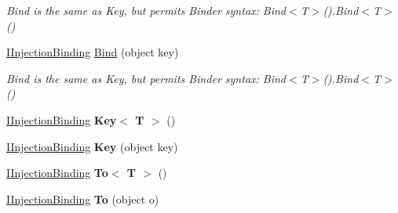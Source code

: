 \begin{DoxyCompactItemize}
\begin{DoxyCompactList}\small\item\em Bind is the same as Key, but permits Binder syntax\-: {\ttfamily Bind$<$T$>$().Bind$<$T$>$()} \end{DoxyCompactList}\item 
\hypertarget{interfacestrange_1_1extensions_1_1injector_1_1api_1_1_i_injection_binding_a156db878da329196cb7db46768db3326}{\hyperlink{interfacestrange_1_1extensions_1_1injector_1_1api_1_1_i_injection_binding}{I\-Injection\-Binding} \hyperlink{interfacestrange_1_1extensions_1_1injector_1_1api_1_1_i_injection_binding_a156db878da329196cb7db46768db3326}{Bind} (object key)}\label{interfacestrange_1_1extensions_1_1injector_1_1api_1_1_i_injection_binding_a156db878da329196cb7db46768db3326}

\begin{DoxyCompactList}\small\item\em Bind is the same as Key, but permits Binder syntax\-: {\ttfamily Bind$<$T$>$().Bind$<$T$>$()} \end{DoxyCompactList}\item 
\hypertarget{interfacestrange_1_1extensions_1_1injector_1_1api_1_1_i_injection_binding_a2ba440297e1fb241be2a5977aef2acf0}{\hyperlink{interfacestrange_1_1extensions_1_1injector_1_1api_1_1_i_injection_binding}{I\-Injection\-Binding} {\bfseries Key$<$ T $>$} ()}\label{interfacestrange_1_1extensions_1_1injector_1_1api_1_1_i_injection_binding_a2ba440297e1fb241be2a5977aef2acf0}

\item 
\hypertarget{interfacestrange_1_1extensions_1_1injector_1_1api_1_1_i_injection_binding_a50a6cad1805b486cdbc1bfadff2494eb}{\hyperlink{interfacestrange_1_1extensions_1_1injector_1_1api_1_1_i_injection_binding}{I\-Injection\-Binding} {\bfseries Key} (object key)}\label{interfacestrange_1_1extensions_1_1injector_1_1api_1_1_i_injection_binding_a50a6cad1805b486cdbc1bfadff2494eb}

\item 
\hypertarget{interfacestrange_1_1extensions_1_1injector_1_1api_1_1_i_injection_binding_adfb689e47ea59142e78ddcc42531e49d}{\hyperlink{interfacestrange_1_1extensions_1_1injector_1_1api_1_1_i_injection_binding}{I\-Injection\-Binding} {\bfseries To$<$ T $>$} ()}\label{interfacestrange_1_1extensions_1_1injector_1_1api_1_1_i_injection_binding_adfb689e47ea59142e78ddcc42531e49d}

\item 
\hypertarget{interfacestrange_1_1extensions_1_1injector_1_1api_1_1_i_injection_binding_ae47d6a358929057d50116bb55ffd9c1a}{\hyperlink{interfacestrange_1_1extensions_1_1injector_1_1api_1_1_i_injection_binding}{I\-Injection\-Binding} {\bfseries To} (object o)}\label{interfacestrange_1_1extensions_1_1injector_1_1api_1_1_i_injection_binding_ae47d6a358929057d50116bb55ffd9c1a}


\end{DoxyCompactItemize}
